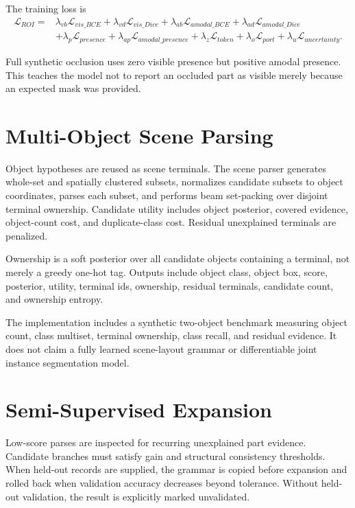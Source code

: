 \documentclass[11pt]{article}
\begin{document}
The training loss is
\begin{align*}
\mathcal{L}_{ROI}={}&
\lambda_{vb}\mathcal{L}_{vis\_BCE}+
\lambda_{vd}\mathcal{L}_{vis\_Dice}+
\lambda_{ab}\mathcal{L}_{amodal\_BCE}+
\lambda_{ad}\mathcal{L}_{amodal\_Dice}\\
&+\lambda_p\mathcal{L}_{presence}+
\lambda_{ap}\mathcal{L}_{amodal\_presence}+
\lambda_z\mathcal{L}_{token}+
\lambda_o\mathcal{L}_{port}+
\lambda_u\mathcal{L}_{uncertainty}.
\end{align*}

Full synthetic occlusion uses zero visible presence but positive amodal presence.
This teaches the model not to report an occluded part as visible merely because an
expected mask was provided.

\section{Multi-Object Scene Parsing}

Object hypotheses are reused as scene terminals. The scene parser generates
whole-set and spatially clustered subsets, normalizes candidate subsets to object
coordinates, parses each subset, and performs beam set-packing over disjoint
terminal ownership. Candidate utility includes object posterior, covered evidence,
object-count cost, and duplicate-class cost. Residual unexplained terminals are
penalized.

Ownership is a soft posterior over all candidate objects containing a terminal,
not merely a greedy one-hot tag. Outputs include object class, object box, score,
posterior, utility, terminal ids, ownership, residual terminals, candidate count,
and ownership entropy.

The implementation includes a synthetic two-object benchmark measuring object
count, class multiset, terminal ownership, class recall, and residual evidence. It
does not claim a fully learned scene-layout grammar or differentiable joint
instance segmentation model.

\section{Semi-Supervised Expansion}

Low-score parses are inspected for recurring unexplained part evidence. Candidate
branches must satisfy gain and structural consistency thresholds. When held-out
records are supplied, the grammar is copied before expansion and rolled back when
validation accuracy decreases beyond tolerance. Without held-out validation, the
result is explicitly marked unvalidated.
\end{document}
